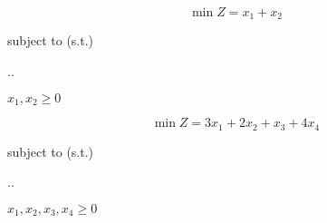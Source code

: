 \begin{frameExample}{}{}
    \[\min Z = x_1 + x_2 \]

  {\centering
    subject to (s.t.)

    \sysdelim..%

    \vspace{5mm}

    $x_1 , x_2 \geq 0$
  \par}
\end{frameExample}


\begin{frameExample}{}{}
    \[\min Z = 3x_1 + 2x_2 + x_3 + 4x_4  \]

  {\centering
    subject to (s.t.)

    \sysdelim..%

    \vspace{5mm}

    $x_1 , x_2, x_3, x_4 \geq 0$
  \par}
\end{frameExample}

